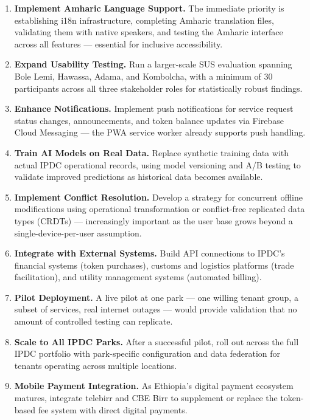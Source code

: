 \begin{enumerate}
\item \textbf{Implement Amharic Language Support.} The immediate priority is establishing i18n infrastructure, completing Amharic translation files, validating them with native speakers, and testing the Amharic interface across all features --- essential for inclusive accessibility.

\item \textbf{Expand Usability Testing.} Run a larger-scale SUS evaluation spanning Bole Lemi, Hawassa, Adama, and Kombolcha, with a minimum of 30 participants across all three stakeholder roles for statistically robust findings.

\item \textbf{Enhance Notifications.} Implement push notifications for service request status changes, announcements, and token balance updates via Firebase Cloud Messaging --- the PWA service worker already supports push handling.

\item \textbf{Train AI Models on Real Data.} Replace synthetic training data with actual IPDC operational records, using model versioning and A/B testing to validate improved predictions as historical data becomes available.

\item \textbf{Implement Conflict Resolution.} Develop a strategy for concurrent offline modifications using operational transformation or conflict-free replicated data types (CRDTs) --- increasingly important as the user base grows beyond a single-device-per-user assumption.

\item \textbf{Integrate with External Systems.} Build API connections to IPDC's financial systems (token purchases), customs and logistics platforms (trade facilitation), and utility management systems (automated billing).

\item \textbf{Pilot Deployment.} A live pilot at one park --- one willing tenant group, a subset of services, real internet outages --- would provide validation that no amount of controlled testing can replicate.

\item \textbf{Scale to All IPDC Parks.} After a successful pilot, roll out across the full IPDC portfolio with park-specific configuration and data federation for tenants operating across multiple locations.

\item \textbf{Mobile Payment Integration.} As Ethiopia's digital payment ecosystem matures, integrate telebirr and CBE Birr to supplement or replace the token-based fee system with direct digital payments.
\end{enumerate}

